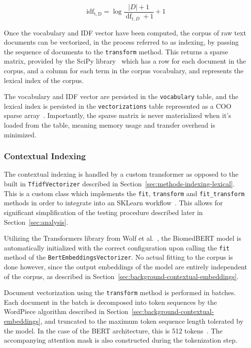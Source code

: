 \documentclass[11pt]{article}
\theoremstyle{plain}
\theoremstyle{definition}
\begin{document}
\begin{equation}\label{eq:sk-idf}
    \operatorname{idf_{t, D}} = \log {\frac{|D| + 1}{\operatorname{df}_{t, D} + 1}} + 1
\end{equation}

Once the vocabulary and IDF vector have been computed, the corpus of raw text documents can be vectorized, in the process referred to as indexing, by passing the sequence of documents to the \verb|transform| method. This returns a sparse matrix, provided by the SciPy library~\cite{virtanen/2020/scipy} which has a row for each document in the corpus, and a column for each term in the corpus vocabulary, and represents the lexical index of the corpus.

The vocabulary and IDF vector are persisted in the \verb|vocabulary| table, and the lexical index is persisted in the \verb|vectorizations| table represented as a COO sparse array~\cite{scipy/2026/cooarray}. Importantly, the sparse matrix is never materialized when it's loaded from the table, meaning memory usage and transfer overhead is minimized.

\subsubsection{Contextual Indexing}\label{sec:methods-indexing-contextual}

The contextual indexing is handled by a custom transformer as opposed to the built in \verb|TfidfVectorizer| described in Section~\ref{sec:methods-indexing-lexical}. This is a custom class which implements the \verb|fit|, \verb|transform| and \verb|fit_transform| methods in order to integrate into an SKLearn workflow~\cite{sklearn/2026/estimators}. This allows for significant simplification of the testing procedure described later in Section~\ref{sec:analysis}.

Utilizing the Transformers library from Wolf et al.\ \cite{wolf/2020/transformers}, the BiomedBERT model is automatically initialized with the correct configuration upon calling the \verb|fit| method of the \verb|BertEmbeddingsVectorizer|. No actual fitting to the corpus is done however, since the output embeddings of the model are entirely independent of the corpus, as described in Section~\ref{sec:background-contextual-embeddings}.

Document vectorization using the \verb|transform| method is performed in batches. Each document in the batch is decomposed into token sequences by the WordPiece algorithm described in Section~\ref{sec:background-contextual-embeddings}, and truncated to the maximum token sequence length tolerated by the model. In the case of the BERT architecture, this is 512 tokens~\cite{sun/2019/finetune}. The accompanying attention mask is also constructed during the tokenization step.
\end{document}
